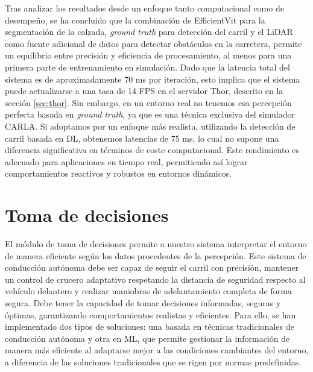 Tras analizar los resultados desde un enfoque tanto computacional como de desempeño, se ha concluido que la combinación de EfficientVit para la segmentación de la calzada, \textit{ground truth} para detección del carril y el \ac{LiDAR} como fuente adicional de datos para detectar obstáculos en la carretera, permite un equilibrio entre precisión y eficiencia de procesamiento, al menos para una primera parte de entrenamiento en simulación. Dado que la latencia total del sistema es de aproximadamente 70 ms por iteración, esto implica que el sistema puede actualizarse a una tasa de 14 \ac{FPS} en el servidor Thor, descrito en la sección \ref{sec:thor}. Sin embargo, en un entorno real no tenemos esa percepción perfecta basada en \textit{ground truth}, ya que es una técnica exclusiva del simulador CARLA. Si adoptamos por un enfoque más realista, utilizando la detección de carril basada en \ac{DL}, obtenemos latencias de 75 ms, lo cual no supone una diferencia significativa en términos de coste computacional. Este rendimiento es adecuado para aplicaciones en tiempo real, permitiendo así lograr comportamientos reactivos y robustos en entornos dinámicos.

\section{Toma de decisiones}

El módulo de toma de decisiones permite a nuestro sistema interpretar el entorno de manera eficiente según los datos procedentes de la percepción. Este sistema de conducción autónoma debe ser capaz de seguir el carril con precisión, mantener un control de crucero adaptativo respetando la distancia de seguridad respecto al vehículo delantero y realizar maniobras de adelantamiento completa de forma segura. Debe tener la capacidad de tomar decisiones informadas, seguras y óptimas, garantizando comportamientos realistas y eficientes. Para ello, se han implementado dos tipos de soluciones: una basada en técnicas tradicionales de conducción autónoma y otra en \ac{ML}, que permite gestionar la información de manera más eficiente al adaptarse mejor a las condiciones cambiantes del entorno, a diferencia de las soluciones tradicionales que se rigen por normas predefinidas.

